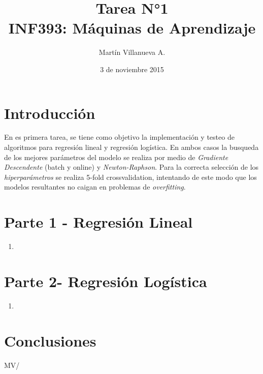 \documentclass[spanish, fleqn]{article}
\title{Tarea N°1 \\INF393: Máquinas de Aprendizaje}
\author{Martín Villanueva A.}
\date{3 de noviembre 2015}
\begin{document}
\maketitle

\thispagestyle{empty}

\section*{Introducción}

En es primera tarea, se tiene como objetivo la implementación y testeo de algoritmos para regresión lineal y regresión logística. En ambos casos la busqueda de  los mejores parámetros del modelo se realiza por medio de 	\textit{Gradiente Descendente} (batch y online) y \textit{Newton-Raphson}. Para la correcta selección de los \textit{hiperparámetros} se realiza 5-fold crossvalidation, intentando de este modo que los modelos resultantes no caigan en problemas de \textit{overfitting}.

\section*{Parte 1 - Regresión Lineal}

\begin{enumerate}
  \item
\end{enumerate}




\section*{Parte 2- Regresión Logística}

\begin{enumerate}
  \item
\end{enumerate}

\section*{Conclusiones}

\vfill\hfill MV/\LaTeXe
\end{document}
